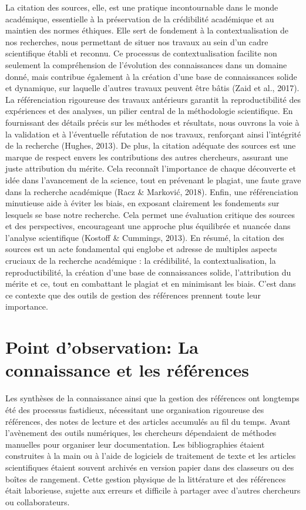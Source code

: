 \documentclass[
  letterpaper,
  DIV=11,
  numbers=noendperiod]{scrreprt}
\begin{document}
La citation des sources, elle, est une pratique incontournable dans le
monde académique, essentielle à la préservation de la crédibilité
académique et au maintien des normes éthiques. Elle sert de fondement à
la contextualisation de nos recherches, nous permettant de situer nos
travaux au sein d'un cadre scientifique établi et reconnu. Ce processus
de contextualisation facilite non seulement la compréhension de
l'évolution des connaissances dans un domaine donné, mais contribue
également à la création d'une base de connaissances solide et dynamique,
sur laquelle d'autres travaux peuvent être bâtis (Zaid et al., 2017). La
référenciation rigoureuse des travaux antérieurs garantit la
reproductibilité des expériences et des analyses, un pilier central de
la méthodologie scientifique. En fournissant des détails précis sur les
méthodes et résultats, nous ouvrons la voie à la validation et à
l'éventuelle réfutation de nos travaux, renforçant ainsi l'intégrité de
la recherche (Hughes, 2013). De plus, la citation adéquate des sources
est une marque de respect envers les contributions des autres
chercheurs, assurant une juste attribution du mérite. Cela reconnaît
l'importance de chaque découverte et idée dans l'avancement de la
science, tout en prévenant le plagiat, une faute grave dans la recherche
académique (Racz \& Marković, 2018). Enfin, une référenciation
minutieuse aide à éviter les biais, en exposant clairement les
fondements sur lesquels se base notre recherche. Cela permet une
évaluation critique des sources et des perspectives, encourageant une
approche plus équilibrée et nuancée dans l'analyse scientifique (Kostoff
\& Cummings, 2013). En résumé, la citation des sources est un acte
fondamental qui englobe et adresse de multiples aspects cruciaux de la
recherche académique : la crédibilité, la contextualisation, la
reproductibilité, la création d'une base de connaissances solide,
l'attribution du mérite et ce, tout en combattant le plagiat et en
minimisant les biais. C'est dans ce contexte que des outils de gestion
des références prennent toute leur importance.

\section{Point d'observation: La connaissance et les
références}\label{point-dobservation-la-connaissance-et-les-ruxe9fuxe9rences}

Les synthèses de la connaissance ainsi que la gestion des références ont
longtemps été des processus fastidieux, nécessitant une organisation
rigoureuse des références, des notes de lecture et des articles
accumulés au fil du temps. Avant l'avènement des outils numériques, les
chercheurs dépendaient de méthodes manuelles pour organiser leur
documentation. Les bibliographies étaient construites à la main ou à
l'aide de logiciels de traitement de texte et les articles scientifiques
étaient souvent archivés en version papier dans des classeurs ou des
boîtes de rangement. Cette gestion physique de la littérature et des
références était laborieuse, sujette aux erreurs et difficile à partager
avec d'autres chercheurs ou collaborateurs.
\end{document}
